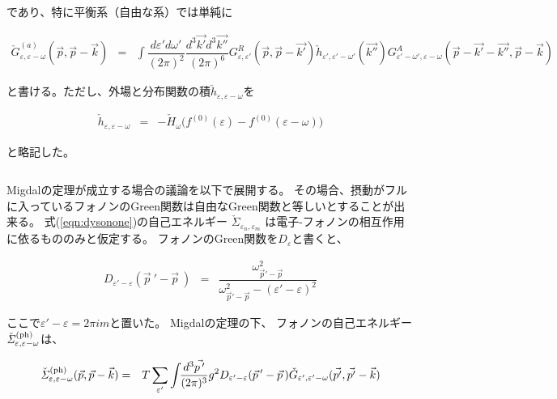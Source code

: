 \documentclass[uplatex,a4j,12pt,dvipdfmx]{jsarticle}
\begin{document}
であり、特に平衡系（自由な系）では単純に

\begin{eqnarray}
	\check{G}^{(a)}_{\varepsilon , \varepsilon - \omega} ( \vec{p} , \vec{p} - \vec{k})
	&=&
	\int \!\! \dfrac{d \varepsilon'  d \omega' }{ (2 \pi)^{2} } \dfrac{d^{3} \vec{k'}  d^{3} \vec{k''} }{ (2 \pi)^{6} }
	G^{R}_{\varepsilon , \varepsilon'} (\vec{p} , \vec{p} - \vec{k'})
	\check{h}_{\varepsilon' , \varepsilon' - \omega'} (\vec{k''})
	G^{A}_{\varepsilon' - \omega' , \varepsilon - \omega} (\vec{p} - \vec{k'} - \vec{k''} , \vec{p} - \vec{k} )
\end{eqnarray}

と書ける。ただし、外場と分布関数の積$\check{h}_{\varepsilon , \varepsilon - \omega}$を

\begin{eqnarray}
	\check{h}_{\varepsilon , \varepsilon - \omega}
	&=&
	- \check{H}_{\omega} \Big( f^{(0)}(\varepsilon) - f^{(0)}(\varepsilon - \omega) \Big)
\end{eqnarray}

と略記した。










${}$











Migdalの定理が成立する場合の議論を以下で展開する。
その場合、摂動がフルに入っているフォノンのGreen関数は自由なGreen関数と等しいとすることが出来る。
式(\ref{eqn:dysonone})の自己エネルギー
$\check{\mathit{\Sigma}}_{\varepsilon_{n},\varepsilon_{m}}$
は電子-フォノンの相互作用に依るもののみと仮定する。
フォノンのGreen関数を$D_{\varepsilon}$と書くと、

\begin{eqnarray}
	D_{\varepsilon' - \varepsilon} ( \vec{p} {\ \!}' - \vec{p} {\ \!} )
	&=&
	\dfrac{ \omega^{2}_{ \vec{p}' - \vec{p} } }{ \omega^{2}_{ \vec{p}' - \vec{p} } - ( \varepsilon' - \varepsilon )^{2} }
\end{eqnarray}

ここで$\varepsilon' - \varepsilon=2 \pi i m$と置いた。
Migdalの定理の下、
フォノンの自己エネルギー$\check{\mathit{\Sigma}}^{(\rm ph)}_{\varepsilon , \varepsilon - \omega}$は、

\begin{eqnarray}
	\check{\mathit{\Sigma}}^{(\rm ph)}_{\varepsilon , \varepsilon - \omega} (\vec{p} , \vec{p} - \vec{k})
	&=&
	T
	\sum_{\varepsilon'}
	\int \!\! \dfrac{ d^{3} \vec{p {} \ \! '} }{ (2 \pi)^{3} }
	g^{2}
	D_{\varepsilon' - \varepsilon} ( \vec{p} {\ \!}' - \vec{p} {\ \!} )
	\check{G}_{\varepsilon' , \varepsilon' - \omega} (\vec{p {} '} , \vec{p {} '} - \vec{k})
\end{eqnarray}
\end{document}
